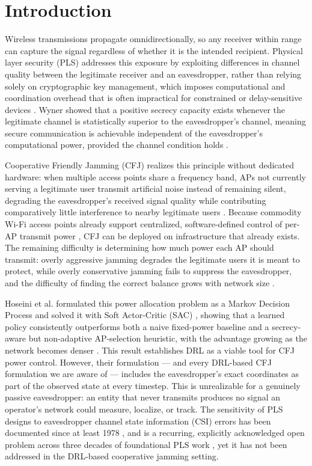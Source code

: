 \documentclass[conference]{IEEEtran}
\begin{document}
\section{Introduction}

Wireless transmissions propagate omnidirectionally, so any receiver within range can capture the signal regardless of whether it is the intended recipient. Physical layer security (PLS) addresses this exposure by exploiting differences in channel quality between the legitimate receiver and an eavesdropper, rather than relying solely on cryptographic key management, which imposes computational and coordination overhead that is often impractical for constrained or delay-sensitive devices \cite{wyner}. Wyner showed that a positive secrecy capacity exists whenever the legitimate channel is statistically superior to the eavesdropper's channel, meaning secure communication is achievable independent of the eavesdropper's computational power, provided the channel condition holds \cite{wyner,gaussian,broadcast}.

Cooperative Friendly Jamming (CFJ) realizes this principle without dedicated hardware: when multiple access points share a frequency band, APs not currently serving a legitimate user transmit artificial noise instead of remaining silent, degrading the eavesdropper's received signal quality while contributing comparatively little interference to nearby legitimate users \cite{tekin,dong}. Because commodity Wi-Fi access points already support centralized, software-defined control of per-AP transmit power \cite{wifi5,spectrum}, CFJ can be deployed on infrastructure that already exists. The remaining difficulty is determining how much power each AP should transmit: overly aggressive jamming degrades the legitimate users it is meant to protect, while overly conservative jamming fails to suppress the eavesdropper, and the difficulty of finding the correct balance grows with network size \cite{hoseini}.

Hoseini et al. formulated this power allocation problem as a Markov Decision Process and solved it with Soft Actor-Critic (SAC) \cite{sac1,sac2}, showing that a learned policy consistently outperforms both a naive fixed-power baseline and a secrecy-aware but non-adaptive AP-selection heuristic, with the advantage growing as the network becomes denser \cite{hoseini}. This result establishes DRL as a viable tool for CFJ power control. However, their formulation --- and every DRL-based CFJ formulation we are aware of --- includes the eavesdropper's exact coordinates as part of the observed state at every timestep. This is unrealizable for a genuinely passive eavesdropper: an entity that never transmits produces no signal an operator's network could measure, localize, or track. The sensitivity of PLS designs to eavesdropper channel state information (CSI) errors has been documented since at least 1978 \cite{gaussian}, and is a recurring, explicitly acknowledged open problem across three decades of foundational PLS work \cite{gaussian,tekin,dong}, yet it has not been addressed in the DRL-based cooperative jamming setting.
\end{document}
